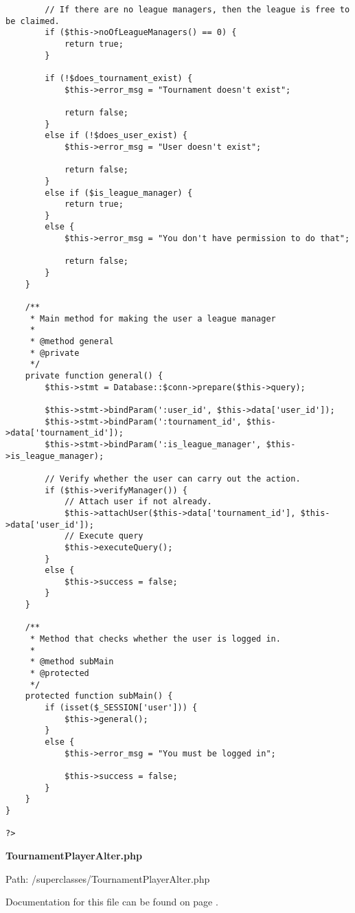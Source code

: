 {\begin{lstlisting}
		// If there are no league managers, then the league is free to be claimed.
		if ($this->noOfLeagueManagers() == 0) {
			return true;
		}

		if (!$does_tournament_exist) {
			$this->error_msg = "Tournament doesn't exist";

			return false;
		}
		else if (!$does_user_exist) {
			$this->error_msg = "User doesn't exist";

			return false;
		}
		else if ($is_league_manager) {
			return true;
		}
		else {
			$this->error_msg = "You don't have permission to do that";

			return false;
		}
	}

	/**
	 * Main method for making the user a league manager
	 *
	 * @method general
	 * @private
	 */
	private function general() {
		$this->stmt = Database::$conn->prepare($this->query);

		$this->stmt->bindParam(':user_id', $this->data['user_id']);
		$this->stmt->bindParam(':tournament_id', $this->data['tournament_id']);
		$this->stmt->bindParam(':is_league_manager', $this->is_league_manager);

		// Verify whether the user can carry out the action.
		if ($this->verifyManager()) {
			// Attach user if not already.
			$this->attachUser($this->data['tournament_id'], $this->data['user_id']);
			// Execute query
			$this->executeQuery();
		}
		else {
			$this->success = false;
		}
	}

	/**
	 * Method that checks whether the user is logged in.
	 *
	 * @method subMain
	 * @protected
	 */
	protected function subMain() {
		if (isset($_SESSION['user'])) {
			$this->general();
		}
		else {
			$this->error_msg = "You must be logged in";

			$this->success = false;
		}
	}
}

?>\end{lstlisting}
}
\textbf{TournamentPlayerAlter.php}\label{TournamentPlayerAlter.php}

Path: /superclasses/TournamentPlayerAlter.php

Documentation for this file can be found on page \pageref{TournamentPlayerAlter.php.doc}.

